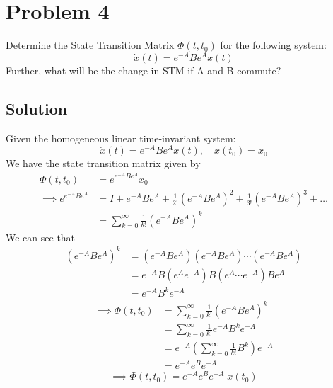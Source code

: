 \section*{Problem 4}

Determine the State Transition Matrix \( \Phi(t,t_0) \) for the following system:
\begin{equation*}
    \dot x(t)
    =
    e^{-A} B e^A x(t)
\end{equation*}
Further, what will be the change in STM if A and B commute?

\subsection*{Solution}

Given the homogeneous linear time-invariant system:
\begin{equation*}
    \dot{x}(t) = e^{-A} B e^A x(t),
    \quad
    x(t_0) = x_0
\end{equation*}
We have the state transition matrix given by
\begin{align*}
    \Phi(t, t_0)
     & =
    e^{e^{-A} B e^A} x_0
    \\
    \implies
    e^{e^{-A} B e^A}
    & =
    I + e^{-A} B e^A + \frac{1}{2!} {(e^{-A} B e^A)}^2 + \frac{1}{3!} {(e^{-A} B e^A)}^3 + \ldots
    \\ & =
    \sum_{k=0}^{\infty} \frac{1}{k!} {(e^{-A} B e^A)}^k
\end{align*}
We can see that
\begin{align*}
    {(e^{-A} B e^A)}^k
     & =
     (e^{-A} B e^A)
     (e^{-A} B e^A)
     \cdots
     (e^{-A} B e^A)
    \\ & =
    e^{-A} B (e^A
    e^{-A}) B (e^A
    \cdots
    e^{-A}) B e^A
    \\ & =
    e^{-A} B^k e^{-A}
\end{align*}
\begin{align*}
    \implies
    \Phi(t, t_0)
    & =
    \sum_{k=0}^{\infty} \frac{1}{k!} {(e^{-A} B e^A)}^k
    \\ & =
    \sum_{k=0}^{\infty} \frac{1}{k!} e^{-A} B^k e^{-A}
    \\ & =
    e^{-A} \left( \sum_{k=0}^{\infty} \frac{1}{k!} B^k \right) e^{-A}
    \\ & =
    e^{-A} e^{B} e^{-A}
\end{align*}
\begin{equation*}
    \implies
    \boxed{
        \Phi(t, t_0)
        =
        e^{-A} e^{B} e^{-A} \; x(t_0)
    }
\end{equation*}
